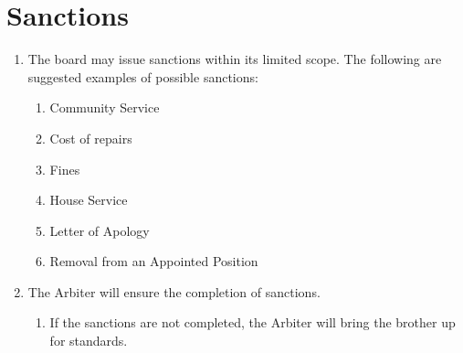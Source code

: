\section{Sanctions}
	\begin{enumerate}
		\item The board may issue sanctions within its limited scope. The following are suggested examples of possible sanctions:
			\begin{enumerate}
				\item Community Service
				\item Cost of repairs
				\item Fines
				\item House Service
				\item Letter of Apology
				\item Removal from an Appointed Position
			\end{enumerate}
		\item The Arbiter will ensure the completion of sanctions.
			\begin{enumerate}
				\item If the sanctions are not completed, the Arbiter will bring the brother up for standards.
			\end{enumerate}

	\end{enumerate}

